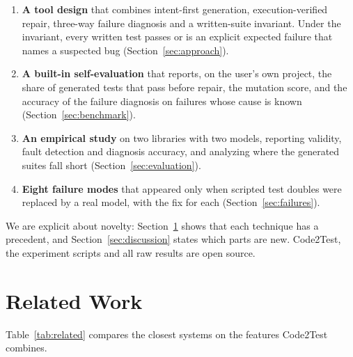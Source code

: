 \documentclass[11pt]{article}
\newcommand{\toolname}{Code2Test}
\begin{document}
\begin{enumerate}
  \item \textbf{A tool design} that combines intent-first generation, execution-verified repair, three-way failure diagnosis and a written-suite invariant.
  Under the invariant, every written test passes or is an explicit expected failure that names a suspected bug (Section~\ref{sec:approach}).
  \item \textbf{A built-in self-evaluation} that reports, on the user's own project, the share of generated tests that pass before repair, the mutation score, and the accuracy of the failure diagnosis on failures whose cause is known (Section~\ref{sec:benchmark}).
  \item \textbf{An empirical study} on two libraries with two models, reporting validity, fault detection and diagnosis accuracy, and analyzing where the generated suites fall short (Section~\ref{sec:evaluation}).
  \item \textbf{Eight failure modes} that appeared only when scripted test doubles were replaced by a real model, with the fix for each (Section~\ref{sec:failures}).
\end{enumerate}

We are explicit about novelty: Section~\ref{sec:related} shows that each technique has a precedent, and Section~\ref{sec:discussion} states which parts are new.
\toolname{}, the experiment scripts and all raw results are open source.

\section{Related Work}\label{sec:related}

Table~\ref{tab:related} compares the closest systems on the features \toolname{} combines.
\end{document}
